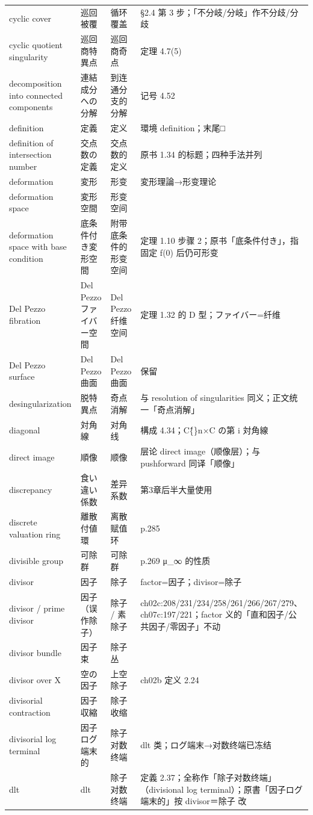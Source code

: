 \begin{longtable}{@{}>{\raggedright\arraybackslash}p{}>{\raggedright\arraybackslash}p{}>{\raggedright\arraybackslash}p{}>{\raggedright\arraybackslash}p{}@{}}
cyclic cover & 巡回被覆 & 循环覆盖 & §2.4 第 3 步；「不分岐/分岐」作不分歧/分歧 \\
cyclic quotient singularity & 巡回商特異点 & 巡回商奇点 & 定理 4.7(5) \\
decomposition into connected components & 連結成分への分解 & 到连通分支的分解 & 记号 4.52 \\
definition & 定義 & 定义 & 環境 definition；末尾□ \\
definition of intersection number & 交点数の定義 & 交点数的定义 & 原书 1.34 的标题；四种手法并列 \\
deformation & 変形 & 形变 & 変形理論→形变理论 \\
deformation space & 変形空間 & 形变空间 &  \\
deformation space with base condition & 底条件付き変形空間 & 附带底条件的形变空间 & 定理 1.10 步骤 2；原书「底条件付き」，指固定 f(0) 后仍可形变 \\
Del Pezzo fibration & Del Pezzo ファイバー空間 & Del Pezzo 纤维空间 & 定理 1.32 的 D 型；ファイバー=纤维 \\
Del Pezzo surface & Del Pezzo 曲面 & Del Pezzo 曲面 & 保留 \\
desingularization & 脱特異点 & 奇点消解 & 与 resolution of singularities 同义；正文统一「奇点消解」 \\
diagonal & 対角線 & 对角线 & 構成 4.34；C\^\{\}n×C の第 i 対角線 \\
direct image & 順像 & 顺像 & 层论 direct image（顺像层）；与 pushforward 同译「顺像」 \\
discrepancy & 食い違い係数 & 差异系数 & 第3章后半大量使用 \\
discrete valuation ring & 離散付値環 & 离散赋值环 & p.285 \\
divisible group & 可除群 & 可除群 & p.269 μ\_∞ 的性质 \\
divisor & 因子 & 除子 & factor=因子；divisor=除子 \\
divisor / prime divisor & 因子（误作除子） & 除子 / 素除子 & ch02c:208/231/234/258/261/266/267/279、ch07c:197/221；factor 义的「直和因子/公共因子/零因子」不动 \\
divisor bundle & 因子束 & 除子丛 &  \\
divisor over X & 空の因子 & 上空除子 & ch02b 定义 2.24 \\
divisorial contraction & 因子収縮 & 除子收缩 &  \\
divisorial log terminal & 因子ログ端末的 & 除子对数终端 & dlt 类；ログ端末→对数终端已冻结 \\
dlt & dlt & 除子对数终端 & 定義 2.37；全称作「除子对数终端」（divisional log terminal）；原書「因子ログ端末的」按 divisor＝除子 改 \\

\end{longtable}

